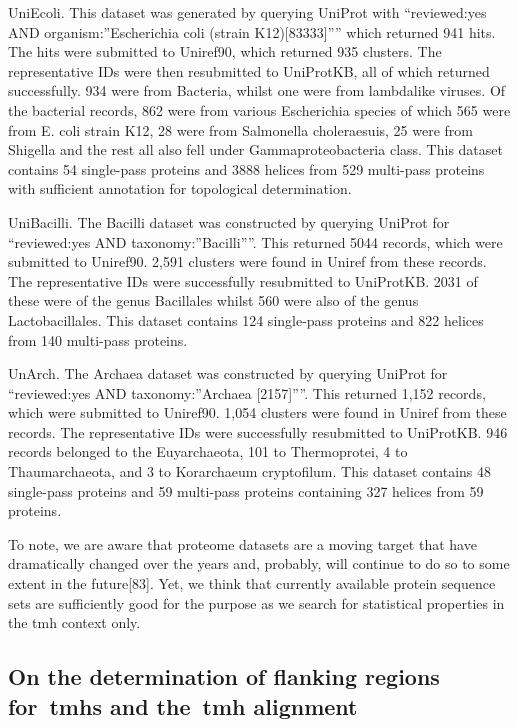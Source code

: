 UniEcoli.
This dataset was generated by querying UniProt with ``reviewed:yes AND organism:''Escherichia coli (strain K12)[83333]'''' which returned 941 hits.
The hits were submitted to Uniref90, which returned 935 clusters.
The representative IDs were then resubmitted to UniProtKB, all of which returned successfully.
934 were from Bacteria, whilst one were from lambdalike viruses.
Of the bacterial records, 862 were from various Escherichia species of which 565 were from E.
coli strain K12, 28 were from Salmonella choleraesuis, 25 were from Shigella and the rest all also fell under Gammaproteobacteria class.
This dataset contains 54 single-pass proteins and 3888 helices from 529 multi-pass proteins with sufficient annotation for topological determination.

UniBacilli.
The Bacilli dataset was constructed by querying UniProt for ``reviewed:yes AND taxonomy:''Bacilli''''.
This returned 5044 records, which were submitted to Uniref90.
2,591 clusters were found in Uniref from these records.
The representative IDs were successfully resubmitted to UniProtKB.
2031 of these were of the genus Bacillales whilst 560 were also of the genus Lactobacillales.
This dataset contains 124 single-pass proteins and 822 helices from 140 multi-pass proteins.

UnArch.
The Archaea dataset was constructed by querying UniProt for ``reviewed:yes AND taxonomy:''Archaea [2157]''''.
This returned 1,152 records, which were submitted to Uniref90.
1,054 clusters were found in Uniref from these records.
The representative IDs were successfully resubmitted to UniProtKB.
946 records belonged to the Euyarchaeota, 101 to Thermoprotei, 4 to Thaumarchaeota, and 3 to Korarchaeum cryptofilum.
This dataset contains 48 single-pass proteins and 59 multi-pass proteins containing 327 helices from 59 proteins.

To note, we are aware that proteome datasets are a moving target that have dramatically changed over the years and, probably, will continue to do so to some extent in the future[83].
Yet, we think that currently available protein sequence sets are sufficiently good for the purpose as we search for statistical properties in the \gls{tmh} context only.

\subsection{On the determination of flanking regions for~\gls{tmh}s and the~\gls{tmh} alignment}

